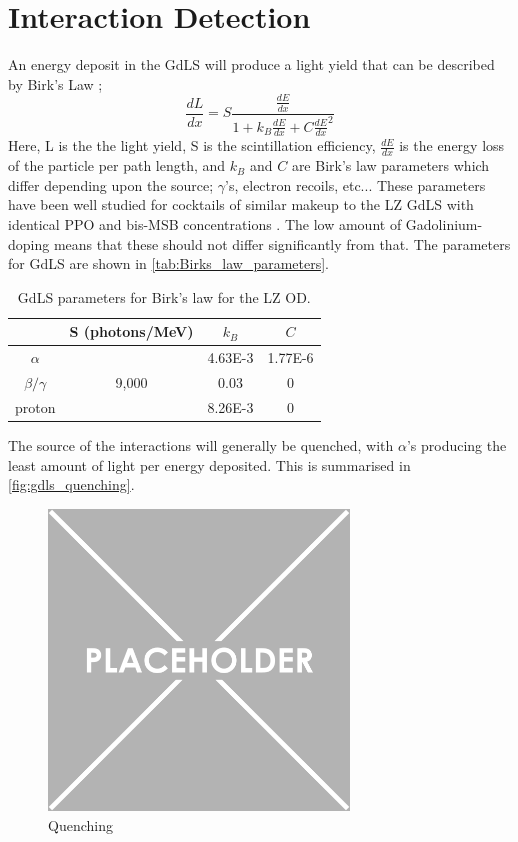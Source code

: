 \section{Interaction Detection}
\label{sec:od_physics}
\par
An energy deposit in the GdLS will produce a light yield that can be described by Birk's Law \cite{birks_law_ref};
\begin{equation} 
    \frac{dL}{dx} = S \frac{\frac{dE}{dx}}{1 + k_{B}\frac{dE}{dx} + C\frac{dE}{dx}^2}
    \label{eq:birkslaw}
\end{equation}
Here, L is the the light yield, S is the scintillation efficiency, $\frac{dE}{dx}$ is the energy loss of the particle per path length, and $k_{B}$ and $C$ are Birk's law parameters which differ depending upon the source; $\gamma$'s, electron recoils, etc...
These parameters have been well studied for cocktails of similar makeup to the LZ GdLS with identical PPO and bis-MSB concentrations \cite{ls_alpha_quenching_ref,ls_proton_quenching_ref}.
The low amount of Gadolinium-doping means that these should not differ significantly from that.
The parameters for GdLS are shown in \autoref{tab:Birks_law_parameters}.
\begin{table}[!htbp]
    \centering
    \begin{tabular}{c | c | c | c }
                   & S (photons/MeV) & $k_{B}$ & $C$ \\ \hline
    $\alpha$       &                 & 4.63E-3 & 1.77E-6 \\
    $\beta/\gamma$ & 9,000           & 0.03    & 0 \\ 
    proton         &                 & 8.26E-3 & 0
    \end{tabular}
    \caption{GdLS parameters for Birk's law for the LZ OD.}
    \label{tab:Birks_law_parameters}
\end{table} 

\par
The source of the interactions will generally be quenched, with $\alpha$'s producing the least amount of light per energy deposited.
This is summarised in \autoref{fig:gdls_quenching}.

\begin{figure}[!htbp]%
    \centering
    \includegraphics[height=8cm]{Figures/Placeholder.png}
    \caption{Quenching}
    \label{fig:gdls_quenching}
\end{figure}

